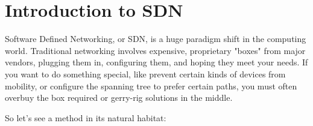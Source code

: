 \chapter{Introduction to SDN}

Software Defined Networking, or SDN, is a huge paradigm shift in the computing world.  
Traditional networking involves 
expensive, proprietary "boxes" from major vendors, plugging them in, configuring them, and hoping they 
meet your needs.  
If you want to do something special, like prevent certain kinds of devices from mobility, or configure 
the spanning tree to prefer certain paths, you must often overbuy the box required or gerry-rig solutions in the middle.

So let's see a method in its natural habitat:



